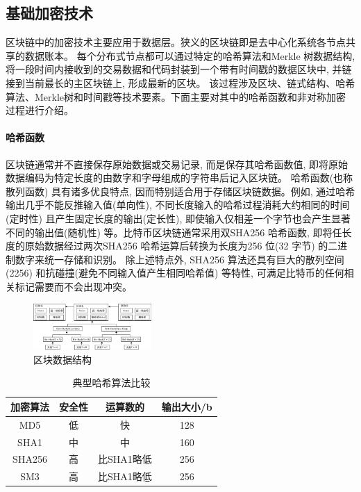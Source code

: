 \documentclass[UTF8,a4paper,10pt, twocolumn]{ctexart}
\begin{document}
\subsection{基础加密技术}
区块链中的加密技术主要应用于数据层。狭义的区块链即是去中心化系统各节点共享的数据账本。 每个分布式节点都可以通过特定的哈希算法和Merkle 树数据结构, 将一段时间内接收到的交易数据和代码封装到一个带有时间戳的数据区块中, 并链接到当前最长的主区块链上, 形成最新的区块。 该过程涉及区块、链式结构、哈希算法、Merkle树和时间戳等技术要素。下面主要对其中的哈希函数和非对称加密过程进行介绍。
\paragraph{哈希函数}
区块链通常并不直接保存原始数据或交易记录, 而是保存其哈希函数值, 即将原始数据编码为特定长度的由数字和字母组成的字符串后记入区块链。 哈希函数(也称散列函数) 具有诸多优良特点, 因而特别适合用于存储区块链数据。例如, 通过哈希输出几乎不能反推输入值(单向性), 不同长度输入的哈希过程消耗大约相同的时间(定时性) 且产生固定长度的输出(定长性), 即使输入仅相差一个字节也会产生显著不同的输出值(随机性) 等。比特币区块链通常采用双SHA256 哈希函数, 即将任长度的原始数据经过两次SHA256 哈希运算后转换为长度为256 位(32 字节) 的二进制数字来统一存储和识别。 除上述特点外, SHA256 算法还具有巨大的散列空间(2256) 和抗碰撞(避免不同输入值产生相同哈希值) 等特性, 可满足比特币的任何相关标记需要而不会出现冲突。
\begin{figure}[htbp]
	\centering
	\includegraphics[width=0.4\textwidth]{fig/hash.png}
	\caption{区块数据结构}
\end{figure}
\begin{table}[hb]
	\caption{典型哈希算法比较} \label{tab:table}
	\centering
	\addtolength{\tabcolsep}{-0mm} %
	\begin{tabular}{cccc}
		\toprule[0.75pt]	%
		加密算法 & 安全性 & 运算数的 & 输出大小/b \\
		\midrule[0.5pt]	%
		MD5 & 低 & 快 & 128 \\  %
		SHA1 & 中 & 中 & 160 \\
		SHA256 & 高 & 比SHA1略低 & 256 \\
		SM3 & 高 & 比SHA1略低 & 256 \\
		\bottomrule[0.75pt]	%
	\end{tabular}
\end{table}
\end{document}
